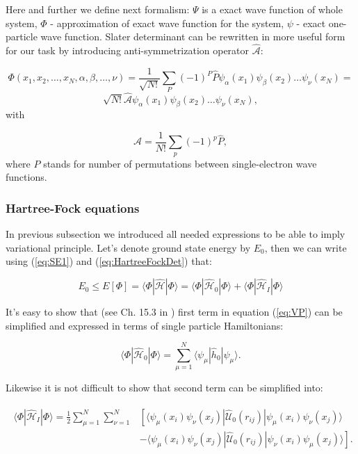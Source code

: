 \documentclass[10pt]{article}
\newcommand*{\hatH}{\hat{\mathcal{H}}}
\newcommand*{\hatU}{\hat{\mathcal{U}}}
\newcommand*{\hatA}{\hat{\mathcal{A}}}
\begin{document}
Here and further we define next formalism:  $\Psi$ is a exact wave function of whole system, $\Phi$ - approximation of exact wave function for the system, $\psi$ - exact one-particle wave function. Slater determinant can be rewritten in more useful form for our task by introducing anti-symmetrization operator $\hatA$:

\[
 \Phi(x_1,x_2,\dots,x_N,\alpha,\beta,\dots,\nu) = \frac{1}{\sqrt{N!}}\sum_{P} (-1)^P\hat{P}\psi_{\alpha}(x_1)
    \psi_{\beta}(x_2)\dots\psi_{\nu}(x_N)=
\]
\[ 
    \sqrt{N!}\hatA\psi_{\alpha}(x_1)
    \psi_{\beta}(x_2)\dots\psi_{\nu}(x_N),
\]
with 

\begin{equation}
  \hatA = \frac{1}{N!}\sum_{p} (-1)^p\hat{P},
\label{antiSymmetryOperator}
\end{equation}
where $P$ stands for number of permutations between single-electron wave functions.


\subsubsection{Hartree-Fock equations}
In previous subsection we introduced all needed expressions to be able to imply variational principle. Let's denote ground state energy by $E_0$, then we can write using (\ref{eq:SE1}) and (\ref{eq:HartreeFockDet}) that:
 
\begin{equation}\label{eq:VP}
E_0 \le E[\Phi] = \langle \Phi|\hatH|\Phi\rangle = \langle \Phi|\hatH_0|\Phi\rangle + \langle \Phi|\hatH_I|\Phi\rangle
\end{equation}

It's easy to show that (see Ch. 15.3 in \cite{one}) first term in equation (\ref{eq:VP}) can be simplified and expressed in terms of single particle Hamiltonians:

\begin{equation}
\langle \Phi|\hatH_0|\Phi\rangle  = \sum_{\mu=1}^N \langle \psi_{\mu} | \hat{h}_0 | \psi_{\mu} \rangle.
\label{eq:fun1}
\end{equation}

Likewise it is not difficult to show that second term can be simplified into:

\begin{align}
\begin{split}
  \langle \Phi|\hatH_I|\Phi\rangle 
  = \frac{1}{2}\sum_{\mu=1}^N\sum_{\nu=1}^N
    &\left[ \langle \psi_{\mu}(x_i)\psi_{\nu}(x_j)|\hatU_{0}(r_{ij})|\psi_{\mu}(x_i)\psi_{\nu}(x_j)\rangle
    \right.
\label{eq:fun2}\\
  &\left.
  - \langle \psi_{\mu}(x_i)\psi_{\nu}(x_j)
  |\hatU_{0}(r_{ij})|\psi_{\nu}(x_i)\psi_{\mu}(x_j)\rangle
  \right]. 
\end{split}
\end{align}
\end{document}
